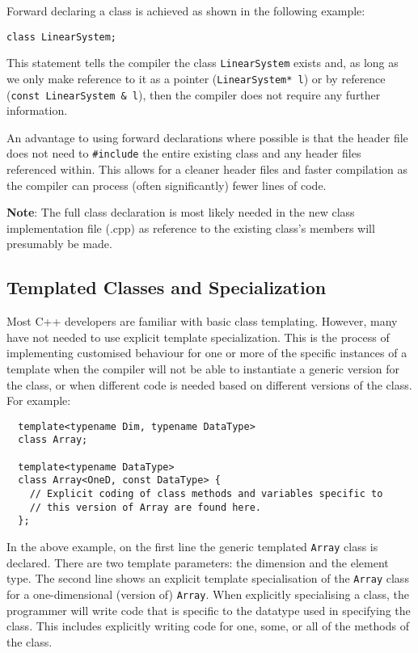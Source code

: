Forward declaring a class is achieved as shown in the following example:
\begin{lstlisting}
class LinearSystem;
\end{lstlisting}
This statement tells the compiler the class \lstinline{LinearSystem} exists and, as long as we only make reference to it as a pointer (\lstinline{LinearSystem* l}) or by reference (\lstinline{const LinearSystem & l}), then the compiler does not require any further information.

An advantage to using forward declarations where possible is that the header file does not need to \lstinline{#include} the entire existing class and any header files referenced within.  This allows for a
cleaner header files and faster compilation as the compiler can process (often significantly) fewer lines of code.

\textbf{Note}: The full class declaration is most likely needed in the new class implementation file (.cpp) as reference to the existing class's members will presumably be made.
  
\subsection{Templated Classes and Specialization}
Most C++ developers are
familiar with basic class templating.  However, many have not needed
to use explicit template specialization.  This is the process of
implementing customised behaviour for one or more of the specific instances of a template when
the compiler will not be able to instantiate a generic version for
the class, or when different code is needed based on different
versions of the class.  For example:
\begin{lstlisting}
  template<typename Dim, typename DataType> 
  class Array;
  
  template<typename DataType>
  class Array<OneD, const DataType> {
    // Explicit coding of class methods and variables specific to
    // this version of Array are found here.
  };
\end{lstlisting}

In the above example, on the first line the generic templated
\lstinline{Array} class is declared. There are two template parameters: the dimension and the element type. The second line shows an explicit
template specialisation of the \lstinline{Array} class for a one-dimensional (version of) \lstinline{Array}.  When explicitly specialising a class, the programmer
will write code that is specific to the datatype used in specifying
the class.  This includes explicitly writing code for one, some, or
all of the methods of the class.

